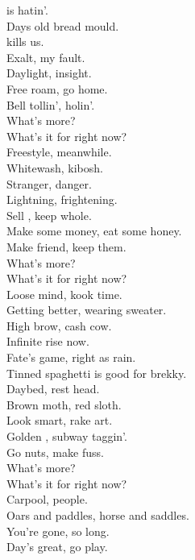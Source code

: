  is hatin'. \\
Days old bread mould. \\
 kills us. \\
Exalt, my fault. \\

Daylight, insight. \\
Free roam, go home. \\
Bell tollin',  holin'. \\

What's more? \\
What's it for right now? \\

Freestyle, meanwhile. \\
Whitewash, kibosh. \\
Stranger, danger. \\
Lightning, frightening. \\

Sell , keep whole. \\
Make some money, eat some honey. \\
Make friend, keep them. \\

What's more? \\
What's it for right now? \\

Loose mind, kook time. \\
Getting better, wearing sweater. \\
High brow, cash cow. \\
Infinite rise now. \\

Fate's game, right as rain. \\
Tinned spaghetti is good for brekky. \\
Daybed, rest head. \\
Brown moth, red sloth. \\

Look smart, rake art. \\
Golden , subway taggin'. \\
Go nuts, make fuss. \\

What's more? \\
What's it for right now? \\

Carpool, people. \\
Oars and paddles, horse and saddles. \\
You're gone, so long. \\
Day's great, go play. \\

